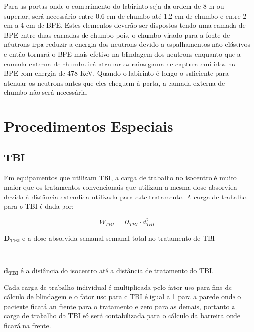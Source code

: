 \documentclass[11pt,a4paper]{article}
\newcounter{exemplo}
\begin{document}
        Para as portas onde o comprimento do labirinto seja da ordem de 8 m ou superior, será necessário entre 0.6 cm de chumbo até 1.2 cm de chumbo e entre 2 cm a 4 cm de BPE. Estes elementos deverão ser dispostos tendo uma camada de BPE entre duas camadas de chumbo pois, o chumbo virado para a fonte de nêutrons irpa reduzir a energia dos neutrons devido a espalhamentos não-elástivos e então tornará o BPE mais efetivo na blindagem dos neutrons enquanto que a camada externa de chumbo irá atenuar os raios gama de captura emitidos no BPE com energia de 478 KeV. Quando o labirinto é longo o suficiente para atenuar os neutrons antes que eles cheguem à porta, a camada externa de chumbo não será necessária.

    \section{Procedimentos Especiais}

    \subsection{TBI}

    Em equipamentos que utilizam TBI, a carga de trabalho no isocentro é muito maior que os tratamentos convencionais que utilizam a mesma dose absorvida devido à distância extendida utilizada para este tratamento. A carga de trabalho para o TBI é dada por:
                
    \begin{equation}
        W_{TBI} = D_{TBI} \cdot d_{TBI}^2
    \end{equation}

    \begin{exemplo}[onde:]
        \textcolor{CarnationPink}{$\mathbf{D_{TBI}}$} e a dose absorvida semanal semanal total no tratamento de TBI
        
        \

        \textcolor{CarnationPink}{$\mathbf{d_{TBI}}$} é a distância do isocentro até a distância de tratamento do TBI.
    \end{exemplo}

    Cada carga de trabalho individual é multiplicada pelo fator uso para fins de cálculo de blindagem e o fator uso para o TBI é igual a 1 para a parede onde o paciente ficará an frente para o tratamento e zero para as demais, portanto a carga de trabalho do TBI só será contabilizada para o cálculo da barreira onde ficará na frente. 
\end{document}
